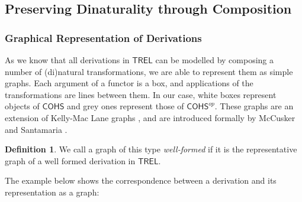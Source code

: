 \documentclass[11pt, oneside]{article}
\theoremstyle{plain}
\theoremstyle{definition}
\newtheorem{definition}[theorem]{Definition}
\newcommand{\sSys}{{\mathsf{TREL}}}%
\newcommand{\cohs}{{\mathsf{COHS}}}
\begin{document}
\subsection{Preserving Dinaturality through Composition}

\subsubsection{Graphical Representation of Derivations}
As we know that all derivations in $\sSys$ can be modelled by composing a number of (di)natural transformations, we are able to represent them as simple graphs.
Each argument of a functor is a box, and applications of the transformations are lines between them.
In our case, white boxes represent objects of $\cohs$ and grey ones represent those of $\cohs^{op}$.
These graphs are an extension of Kelly-Mac Lane graphs \cite{mac2013categories}, and are introduced formally by McCusker and Santamaria \cite{mccusker2018compositionality}.

\begin{definition}
We call a graph of this type \textit{well-formed} if it is the representative graph of a well formed derivation in $\sSys$.
\end{definition}
The example below shows the correspondence between a derivation and its representation as a graph:
\end{document}
